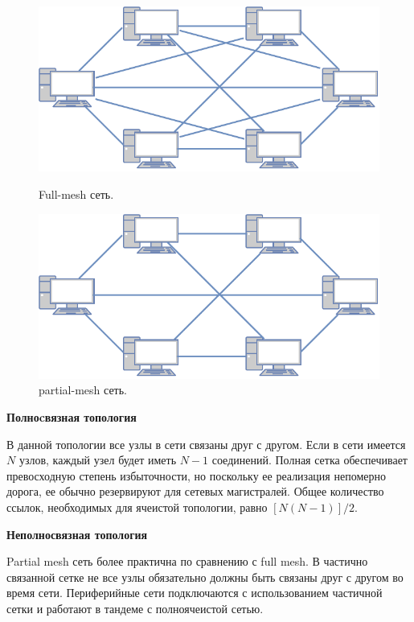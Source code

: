 \documentclass[a4paper]{article}
\begin{document}
\begin{figure}[H]
	\begin{center}
	\begin{minipage}[h]{0.45\linewidth}
	\includegraphics[width=1\linewidth]{full.pdf}
	\caption{Full-mesh сеть.} 
    \label{p2}
	\end{minipage}
	\hfill 
	\begin{minipage}[h]{0.43\linewidth}
	\includegraphics[width=1\linewidth]{partial.pdf}
	\caption{partial-mesh сеть.}
	\label{p3}
	\end{minipage}
	\end{center}
\end{figure}

\textbf{Полноcвязная топология} \par

В данной топологии все узлы в сети связаны друг с другом. Если в сети имеется $N$ узлов, каждый узел будет иметь $N-1$ соединений.
 Полная сетка обеспечивает превосходную степень избыточности, но поскольку ее реализация непомерно дорога, ее обычно резервируют для сетевых магистралей.
 Общее количество ссылок, необходимых для ячеистой топологии, равно $[N(N-1)]/2$.

\textbf{Неполносвязная топология}

Partial mesh сеть более практична по сравнению с full mesh. В частично связанной сетке не все узлы обязательно должны быть связаны друг с другом во время сети. 
Периферийные сети подключаются с использованием частичной сетки и работают в тандеме с полноячеистой сетью.
\end{document}

